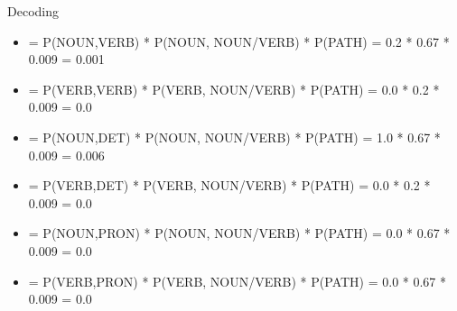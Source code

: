 \documentclass{beamer}
\begin{document}
\begin{frame}{Decoding}
\begin{center}
\begin{onlyenv}

{\tiny
\begin{itemize}
  \item = P(NOUN,VERB) * P(NOUN, NOUN/VERB) * P(PATH) = 0.2 * 0.67 * 0.009 = 0.001
  \item = P(VERB,VERB) * P(VERB, NOUN/VERB) * P(PATH) = 0.0 * 0.2  * 0.009 = 0.0
  \item = P(NOUN,DET) * P(NOUN, NOUN/VERB) * P(PATH) =  1.0 * 0.67 * 0.009 = 0.006
  \item = P(VERB,DET) * P(VERB, NOUN/VERB) * P(PATH) =  0.0 * 0.2  * 0.009 = 0.0
  \item = P(NOUN,PRON) * P(NOUN, NOUN/VERB) * P(PATH) = 0.0 * 0.67 * 0.009 = 0.0 
  \item = P(VERB,PRON) * P(VERB, NOUN/VERB) * P(PATH) = 0.0 * 0.67 * 0.009 = 0.0
\end{itemize}
}

\end{onlyenv}



\end{center}
\end{frame}
\end{document}
